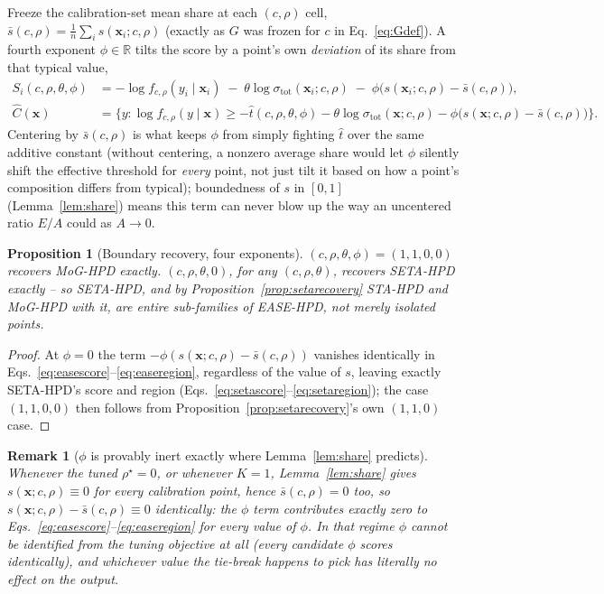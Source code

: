 \documentclass[11pt]{article}
\newtheorem{proposition}{Proposition}[section]
\newtheorem{remark}{Remark}[section]
\begin{document}
Freeze the calibration-set mean share at each $(c,\rho)$ cell, $\bar s(c,\rho) = \tfrac1n\sum_i
s(\bm x_i;c,\rho)$ (exactly as $G$ was frozen for $c$ in Eq.~\ref{eq:Gdef}). A fourth exponent
$\phi\in\mathbb R$ tilts the score by a point's own \emph{deviation} of its share from that typical
value,
\begin{align}
S_i(c,\rho,\theta,\phi) &= -\log f_{c,\rho}(y_i\mid\bm x_i) \;-\; \theta\log\sigma_{\mathrm{tot}}(\bm
x_i;c,\rho) \;-\; \phi\big(s(\bm x_i;c,\rho) - \bar s(c,\rho)\big), \label{eq:easescore}\\
\hat C(\bm x) &= \Big\{y : \log f_{c,\rho}(y\mid\bm x) \ge -\hat t(c,\rho,\theta,\phi) -
\theta\log\sigma_{\mathrm{tot}}(\bm x;c,\rho) - \phi\big(s(\bm x;c,\rho)-\bar s(c,\rho)\big)
\Big\}. \label{eq:easeregion}
\end{align}
Centering by $\bar s(c,\rho)$ is what keeps $\phi$ from simply fighting $\hat t$ over the same
additive constant (without centering, a nonzero average share would let $\phi$ silently shift the
effective threshold for \emph{every} point, not just tilt it based on how a point's composition
differs from typical); boundedness of $s$ in $[0,1]$ (Lemma~\ref{lem:share}) means this term can
never blow up the way an uncentered ratio $E/A$ could as $A\to0$.

\begin{proposition}[Boundary recovery, four exponents]
\label{prop:easerecovery}
$(c,\rho,\theta,\phi)=(1,1,0,0)$ recovers MoG-HPD exactly. $(c,\rho,\theta,0)$, for \emph{any}
$(c,\rho,\theta)$, recovers SETA-HPD exactly -- so SETA-HPD, and by
Proposition~\ref{prop:setarecovery} STA-HPD and MoG-HPD with it, are entire sub-families of
EASE-HPD, not merely isolated points.
\end{proposition}
\begin{proof}
At $\phi=0$ the term $-\phi(s(\bm x;c,\rho)-\bar s(c,\rho))$ vanishes identically in
Eqs.~\eqref{eq:easescore}--\eqref{eq:easeregion}, regardless of the value of $s$, leaving exactly
SETA-HPD's score and region (Eqs.~\ref{eq:setascore}--\ref{eq:setaregion}); the case
$(1,1,0,0)$ then follows from Proposition~\ref{prop:setarecovery}'s own $(1,1,0)$ case.
\end{proof}

\begin{remark}[$\phi$ is provably inert exactly where Lemma~\ref{lem:share} predicts]
\label{rem:phiinert}
Whenever the tuned $\rho^\star=0$, or whenever $K=1$, Lemma~\ref{lem:share} gives
$s(\bm x;c,\rho)\equiv0$ for every calibration point, hence $\bar s(c,\rho)=0$ too, so
$s(\bm x;c,\rho)-\bar s(c,\rho)\equiv0$ identically: the $\phi$ term contributes exactly zero to
Eqs.~\eqref{eq:easescore}--\eqref{eq:easeregion} for \emph{every} value of $\phi$. In that regime
$\phi$ cannot be identified from the tuning objective at all (every candidate $\phi$ scores
identically), and whichever value the tie-break happens to pick has literally no effect on the
output.
\end{remark}
\end{document}
